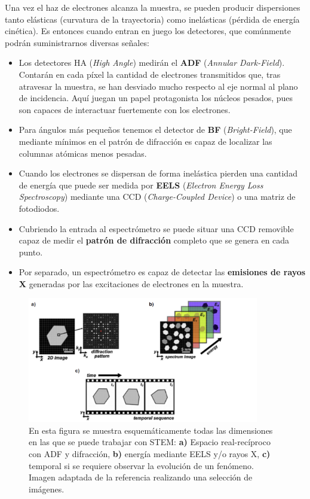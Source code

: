 Una vez el haz de electrones alcanza la muestra, se pueden producir dispersiones tanto elásticas (curvatura de la trayectoria) como inelásticas (pérdida de energía cinética). Es entonces cuando entran en juego los detectores, que comúnmente podrán suministrarnos diversas señales:

\begin{itemize}
    \item Los detectores HA (\textit{High Angle})  medirán el \textbf{ADF} (\textit{Annular Dark-Field}). Contarán en cada píxel la cantidad de electrones transmitidos que, tras atravesar la muestra, se han desviado mucho respecto al eje normal al plano de incidencia. Aquí juegan un papel protagonista los núcleos pesados, pues son capaces de interactuar fuertemente con los electrones.

    \item Para ángulos más pequeños tenemos el detector de \textbf{BF} (\textit{Bright-Field}), que mediante mínimos en el patrón de difracción es capaz de localizar las columnas atómicas menos pesadas.
    
    \item Cuando los electrones se dispersan de forma inelástica pierden una cantidad de energía que puede ser medida por \textbf{EELS} (\textit{Electron Energy Loss Spectroscopy}) mediante una CCD (\textit{Charge-Coupled Device}) o una matriz de fotodiodos.
    
    \item Cubriendo la entrada al espectrómetro se puede situar una CCD removible capaz de medir el \textbf{patrón de difracción} completo que se genera en cada punto.
    
    \item Por separado, un espectrómetro es capaz de detectar las \textbf{emisiones de rayos X} generadas por las excitaciones de electrones en la muestra.
\end{itemize}

\vspace{0.1cm}

\begin{figure}[h!]
    \centering
    \includegraphics[width=0.9\textwidth]{fig/Fig2.png}
    \caption{En esta figura se muestra esquemáticamente todas las dimensiones en las que se puede trabajar con STEM: \textbf{a)} Espacio real-recíproco con ADF y difracción, \textbf{b)} energía mediante EELS y/o rayos X, \textbf{c)} temporal si se requiere observar la evolución de un fenómeno. Imagen adaptada de la referencia \cite{foto_intro} realizando una selección de imágenes.}
    \label{fig:2}
\end{figure}

